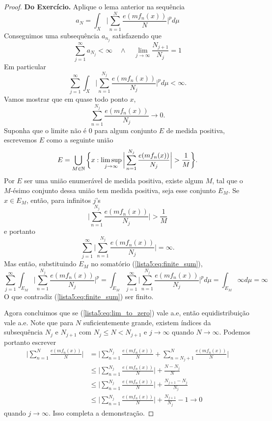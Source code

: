 \label{lista5:eq:limite_int}
\begin{proof}
    \textbf{Do Exercício.} Aplique o lema anterior na sequência
    $$a_N = \int_X \bigg|\sum_{n=1}^{N} \frac{e(mf_n(x))}{N} \bigg|^p d\mu$$
    Conseguimos uma subsequência $a_{n_j}$ satisfazendo que 
    $$\sum_{j=1}^{\infty} a_{N_j} < \infty \quad \land \quad \lim_{j \to \infty} \frac{N_{j+1}}{N _j} = 1$$
    Em particular
    \begin{equation}
        \label{lista5:eq:finite_sum}
        \sum_{j=1}^{\infty} \int_X \bigg|\sum_{n=1}^{N_j} \frac{e(mf_n(x))}{N_j} \bigg|^p d\mu < \infty.
    \end{equation}
    Vamos mostrar que em quase todo ponto $x$, 
    \begin{equation}
        \label{lista5:eq:lim_to_zero} 
        \sum_{n=1}^{N_j} \frac{e(mf_n(x))}{N_j} \to 0.
    \end{equation}
    Suponha que o limite não é $0$ para algum conjunto $E$ de medida positiva, escrevemos $E$ como a seguinte união
    $$E = \bigcup_{M \in \mathbb{N}} \bigg\{ x : \limsup_{j\rightarrow\infty} \bigg|\sum_{n=1}^{N_j} \frac{e(mf_n(x))}{N_j}\bigg| > \frac{1}{M} \bigg\}.$$
    Por $E$ ser uma união enumerável de medida positiva, existe algum $M$, tal que o $M$-ésimo conjunto dessa união tem medida
    positiva, seja esse conjunto $E_M$. Se $x \in E_M$, então, para infinitos $j$'s
    $$\bigg|\sum_{n=1}^{N_j} \frac{e(mf_n(x))}{N_j}\bigg| > \frac{1}{M}$$
    e portanto
    $$\sum_{j=1}^{\infty} \bigg|\sum_{n=1}^{N_j} \frac{e(mf_n(x))}{N_j}\bigg| = \infty.$$
    Mas então, substituindo $E_M$ no somatório (\ref{lista5:eq:finite_sum}),
    $$\sum_{j=1}^{\infty} \int_{E_M} \bigg|\sum_{n=1}^{N_j} \frac{e(mf_n(x))}{N_j} \bigg|^p = \int_{E_M} \sum_{j=1}^{\infty} \bigg|\sum_{n=1}^{N_j} \frac{e(mf_n(x))}{N_j} \bigg|^p d\mu = \int_{E_M} \infty d\mu = \infty $$
    O que contradiz (\ref{lista5:eq:finite_sum}) ser finito.

    Agora concluimos que se (\ref{lista5:eq:lim_to_zero}) vale a.e, então equidistribuição vale a.e.
    Note que para $N$ suficientemente grande, existem índices da subsequência $N_j$ e $N_{j+1}$
    com $N_j \leq N < N_{j+1}$ e $j \to \infty$ quando $N \to \infty$. Podemos portanto escrever
    \begin{align*}
        \bigg|\sum_{n=1}^{N} \frac{e(mf_n(x))}{N}\bigg| &= \bigg|\sum_{n=1}^{N_j} \frac{e(mf_n(x))}{N} + \sum_{n=N_j + 1}^{N} \frac{e(mf_n(x))}{N} \bigg|\\
        &\leq \bigg|\sum_{n=1}^{N_j} \frac{e(mf_n(x))}{N}\bigg| + \frac{N - N_j}{N}\\
        &\leq \bigg|\sum_{n=1}^{N_j} \frac{e(mf_n(x))}{N}\bigg| + \frac{N_{j+1} - N_j}{N_j}\\
        &\leq \bigg|\sum_{n=1}^{N_j} \frac{e(mf_n(x))}{N}\bigg| + \frac{N_{j+1}}{N_j} - 1 \to 0
    \end{align*}
    quando $j \to \infty$. Isso completa a demonstração.

\end{proof}


